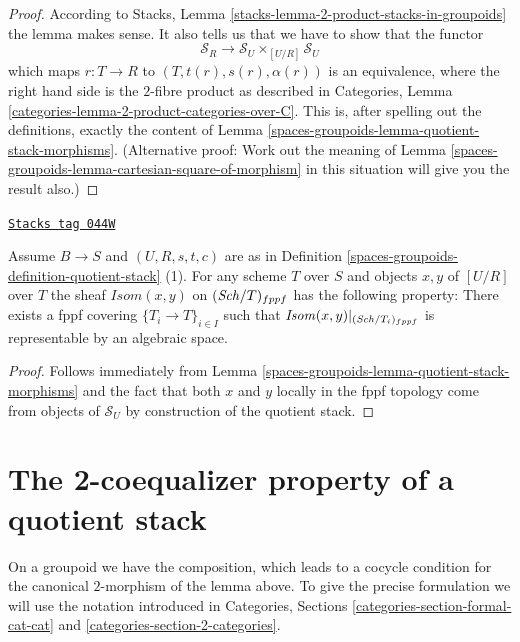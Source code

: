 \begin{proof}
According to
Stacks, Lemma \ref{stacks-lemma-2-product-stacks-in-groupoids}
the lemma makes sense. It also tells us that we have to show that
the functor
$$
\mathcal{S}_R \longrightarrow \mathcal{S}_U \times_{[U/R]} \mathcal{S}_U
$$
which maps $r : T \to R$ to $(T, t(r), s(r), \alpha(r))$ is an equivalence,
where the right hand side is the $2$-fibre product as described in
Categories, Lemma \ref{categories-lemma-2-product-categories-over-C}.
This is, after spelling out the definitions, exactly the content of
Lemma \ref{spaces-groupoids-lemma-quotient-stack-morphisms}. (Alternative proof: Work out
the meaning of
Lemma \ref{spaces-groupoids-lemma-cartesian-square-of-morphism}
in this situation will give you the result also.)
\end{proof}

\begin{lemma}
\label{spaces-groupoids-lemma-quotient-stack-isom}
\href{https://stacks.math.columbia.edu/tag/044W}{\texttt{Stacks tag 044W}}

Assume $B \to S$ and $(U, R, s, t, c)$ are as in
Definition \ref{spaces-groupoids-definition-quotient-stack} (1).
For any scheme $T$ over $S$ and objects $x, y$ of $[U/R]$ over $T$
the sheaf $\mathit{Isom}(x, y)$ on $(\mathit{Sch}/T)_{fppf}$ has
the following property: There exists a fppf covering
$\{T_i \to T\}_{i \in I}$ such that
$\mathit{Isom}(x, y)|_{(\mathit{Sch}/T_i)_{fppf}}$
is representable by an algebraic space.
\end{lemma}

\begin{proof}
Follows immediately from
Lemma \ref{spaces-groupoids-lemma-quotient-stack-morphisms}
and the fact that both $x$ and $y$ locally in the fppf
topology come from objects of $\mathcal{S}_U$ by construction
of the quotient stack.
\end{proof}

\section{The 2-coequalizer property of a quotient stack}
\label{spaces-groupoids-section-quotient-stacks-2-coequalize}
On a groupoid we have the composition, which leads to a cocycle
condition for the canonical $2$-morphism of the lemma above.
To give the precise formulation we will use the notation introduced in
Categories, Sections \ref{categories-section-formal-cat-cat} and
\ref{categories-section-2-categories}.

